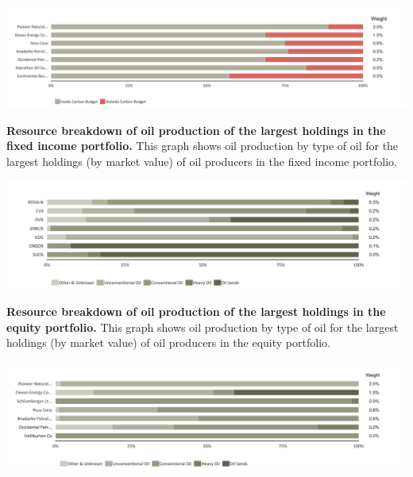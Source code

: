 \documentclass[10pt,table,a4]{article}\usepackage[]{graphicx}\usepackage[]{color}
\begin{document}
	\vspace{-.35cm}
	
	\begin{center}
		\includegraphics[trim = {0 0cm 0 0},width=1\linewidth]{CAFigures/Fig48}
	\end{center}
	
	
	\textbf{Resource breakdown of oil production of the largest holdings in the fixed income portfolio.}
	This graph shows oil production by type of oil for the largest holdings (by market value) of oil producers in the fixed income portfolio. 
	
	\vspace{-.35cm}
	
	\begin{center}
		\includegraphics[trim = {0 0cm 0 0},width=1\linewidth]{CAFigures/Fig43}
	\end{center}
	
	\textbf{Resource breakdown of oil production of the largest holdings in the equity portfolio.}
	This graph shows oil production by type of oil for the largest holdings (by market value) of oil producers in the equity portfolio. 
	
	\vspace{-.35cm}

	\begin{center}
		\includegraphics[trim = {0 0cm 0 0},width=1\linewidth]{CAFigures/Fig47}
	\end{center}
	
\end{document}
